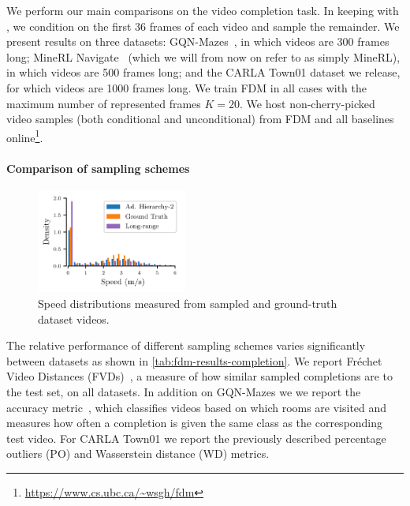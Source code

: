 We perform our main comparisons on the video completion task. In keeping with \citet{saxena2021clockwork}, we condition on the first 36 frames of each video and sample the remainder. We present results on three datasets: GQN-Mazes~\citep{eslami2018neural}, in which videos are 300 frames long; MineRL Navigate~\citep{guss2019minerl,saxena2021clockwork} (which we will from now on refer to as simply MineRL), in which videos are 500 frames long; and the CARLA Town01 dataset we release, for which videos are 1000 frames long. We train FDM in all cases with the maximum number of represented frames $K=20$. We host non-cherry-picked video samples (both conditional and unconditional) from FDM and all baselines online\footnote{\url{https://www.cs.ubc.ca/~wsgh/fdm}}.



\paragraph{Comparison of sampling schemes}
\begin{figure}
  \vspace{-.3cm}
  \begin{center}
    \includegraphics[width=0.44\textwidth]{figs/fdm/hist_new.pdf}
  \end{center}
  \caption{Speed distributions measured from sampled and ground-truth dataset videos.}
  \label{fig:hist}
\end{figure}
The relative performance of different sampling schemes varies significantly between datasets as shown in \cref{tab:fdm-results-completion}. We report Fréchet Video Distances (FVDs)~\cite{unterthiner2018towards}, a measure of how similar sampled completions are to the test set, on all datasets. In addition on GQN-Mazes we we report the accuracy metric~\cite{saxena2021clockwork}, which classifies videos based on which rooms are visited and measures how often a completion is given the same class as the corresponding test video. For CARLA Town01 we report the previously described percentage outliers (PO) and Wasserstein distance (WD) metrics. 


